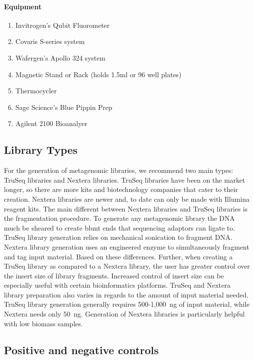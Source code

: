\documentclass[graybox]{svmult}
\begin{document}
\paragraph{Equipment}
\begin{enumerate}
\item{    Invitrogen’s Qubit Fluorometer}
\item{      Covaris S-series system}
\item{      Wafergen’s Apollo 324 system}
\item{      Magnetic Stand or Rack (holds 1.5ml or 96 well plates)}
\item{      Thermocycler}
\item{      Sage Science’s Blue Pippin Prep}
\item{      Agilent 2100 Bioanalyer}
\end{enumerate}

\subsection{Library Types}
For the generation of metagenomic libraries, we recommend two main types: TruSeq libraries and Nextera libraries.  TruSeq libraries have been on the market longer, so there are more kits and biotechnology companies that cater to their creation. 
Nextera libraries are newer and, to date can only be made with Illumina reagent kits.  
The main different between Nextera libraries and TruSeq libraries is the fragmentation procedure. 
To generate any metagenomic library the DNA much be sheared to create blunt ends that sequencing adaptors can ligate to. TruSeq library generation relies on mechanical sonication to fragment DNA. Nextera library generation uses an engineered enzyme to simultaneously fragment and tag input material. Based on these differences. Further, when creating a TruSeq library as compared to a Nextera library, the user has greater control over the insert size of library fragments.  Increased control of insert size can be especially useful with certain bioinformatics platforms. TruSeq and Nextera library preparation also varies in regards to the amount of input material needed. TruSeq library generation generally requires 500-1,000~ng of input material, while Nextera needs only 50~ng. Generation of Nextera libraries is particularly helpful with low biomass samples.

\subsection{Positive and negative controls }
\end{document}
